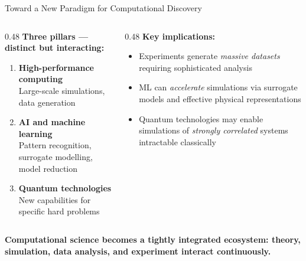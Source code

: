 \documentclass[aspectratio=169]{beamer}
\begin{document}
\begin{frame}{Toward a New Paradigm for Computational Discovery}

  \begin{columns}[T]
    \begin{column}{0.48\textwidth}
      \textbf{Three pillars — distinct but interacting:}
      \medskip
      \begin{enumerate}
        \setlength\itemsep{6pt}
        \item \textcolor{mqblue}{\bfseries High-performance computing}\\
              \small Large-scale simulations, data generation
        \item \textcolor{mqblue}{\bfseries AI and machine learning}\\
              \small Pattern recognition, surrogate modelling, model reduction
        \item \textcolor{mqblue}{\bfseries Quantum technologies}\\
              \small New capabilities for specific hard problems
      \end{enumerate}
    \end{column}
    \begin{column}{0.48\textwidth}
      \textbf{Key implications:}
      \medskip
      \begin{itemize}
        \setlength\itemsep{6pt}
        \item Experiments generate \emph{massive datasets} requiring
              sophisticated analysis
        \item ML can \emph{accelerate} simulations via surrogate models
              and effective physical representations
        \item Quantum technologies may enable simulations of
              \emph{strongly correlated} systems intractable classically
      \end{itemize}
    \end{column}
  \end{columns}

  \bigskip
  \begin{center}
    \textcolor{mqblue}{\bfseries
    Computational science becomes a tightly integrated ecosystem:
    theory, simulation, data analysis, and experiment interact continuously.}
  \end{center}

\end{frame}
\end{document}
